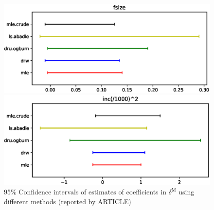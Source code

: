 \documentclass{article}
\begin{document}
\begin{figure}
\begin{minipage}{0.48\linewidth}
\end{minipage}
\begin{minipage}{0.48\linewidth}
\includegraphics[width=\linewidth]{all4.eps}
\end{minipage}
\begin{minipage}{0.48\linewidth}
\includegraphics[width=\linewidth]{all5.eps}
\end{minipage}
\caption{95\% Confidence intervals of estimates of coefficients in $\delta^{\mathrm{M}}$ using different methods (reported by ARTICLE)}
\label{theirci}
\end{figure}
\end{document}
